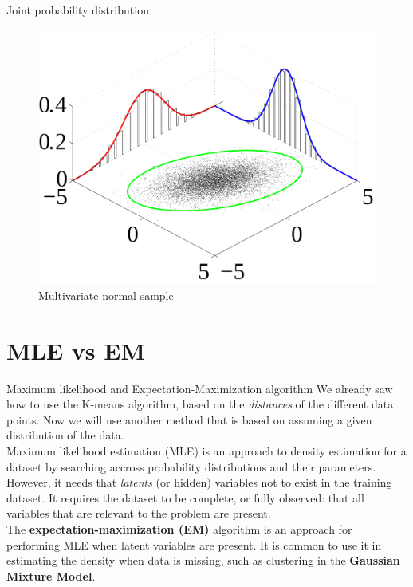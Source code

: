 \documentclass{beamer}
\begin{document}
\begin{frame}{Joint probability distribution}
    \begin{figure}
        \includegraphics[width=0.8\linewidth]{Multivariate_normal_sample}
        \caption{\href{https://commons.wikimedia.org/wiki/File:Multivariate_normal_sample.svg}{Multivariate normal sample}}
    \end{figure}
\end{frame}

\section{MLE vs EM}
\begin{frame}{Maximum likelihood and Expectation-Maximization algorithm}
    We already saw how to use the K-means algorithm, based on the {\em distances} of the different data points. Now we will use another method that is based on assuming a given distribution of the data. 
    \\[10pt]
    Maximum likelihood estimation (MLE) is an approach to density estimation for a dataset by searching accross probability distributions and their parameters. However, it needs that {\em latents} (or hidden) variables not to exist in the training dataset. It requires the dataset to be complete, or fully observed: that all variables that are relevant to the problem are present.
    \\[10pt]
    The {\bf expectation-maximization (EM)} algorithm is an approach for performing MLE when latent variables are present. It is common to use it in estimating the density when data is missing, such as clustering in the {\bf Gaussian Mixture Model}.
\end{frame}
\end{document}
